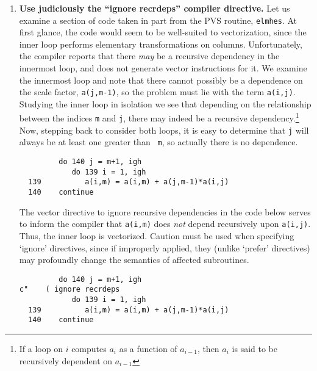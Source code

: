 \begin{enumerate}
 Note that in the NATS version, the inner product is computed with a negative
 stride, and in the elementary transformation the product {\tt f * ort(i)} is
 subtracted from {\tt a(i,j)}.  Making the two small changes to obtain the
 PVS code yielded more than a 10\% performance improvement for $N$ as small
 as $100$.\footnote{Note that there was a third change: the division by
 {\tt h} in NATS was replaced in PVS by a multiplication by its inverse.
 Although multiplies are cheaper than divides on the 3090-vf, such a change
 does not yield a discernible performance improvement in this case.  }

 \item {\bf Use judiciously the ``ignore recrdeps'' compiler directive.}
Let us examine a section of code taken in part from the PVS routine,
{\tt elmhes}.  At first glance, the code would seem to be well-suited
to vectorization, since the inner loop performs elementary
transformations on columns.  Unfortunately, the compiler reports that
there {\em may} be a recursive dependency in the innermost loop, and
does not generate vector instructions for it.  We examine the innermost
loop and note that there cannot possibly be a dependence on the scale
factor, {\tt a(j,m-1)}, so the problem must lie with the term {\tt a(i,j)}.
Studying the inner loop in isolation we see that depending on
the relationship between the indices {\tt m} and {\tt j}, there may
indeed be a recursive dependency.\footnote{If a loop
on $i$ computes $a_i$ as a function of $a_{i-1}$, then
$a_i$ is said to be recursively dependent on $a_{i-1}$}
Now, stepping back to consider both loops, it is easy to
determine that {\tt j} will always be at least one greater than {\tt
m}, so actually there is no dependence.

\begin{verbatim}
         do 140 j = m+1, igh
            do 139 i = 1, igh
  139          a(i,m) = a(i,m) + a(j,m-1)*a(i,j)
  140    continue
\end{verbatim}
The vector directive to ignore recursive dependencies in the code below
serves to inform the compiler that {\tt a(i,m)} does {\em not} depend
recursively upon {\tt a(i,j)}.  Thus, the inner loop is vectorized.
Caution must be used when specifying `ignore' directives, since if improperly
applied, they (unlike `prefer' directives) may profoundly change the semantics
of affected subroutines.

\begin{verbatim}
         do 140 j = m+1, igh
c"    ( ignore recrdeps
            do 139 i = 1, igh
  139          a(i,m) = a(i,m) + a(j,m-1)*a(i,j)
  140    continue
\end{verbatim}
\end{enumerate}
